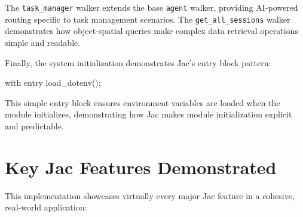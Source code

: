 The \texttt{task\_manager} walker extends the base \texttt{agent} walker, providing AI-powered routing specific to task management scenarios. The \texttt{get\_all\_sessions} walker demonstrates how object-spatial queries make complex data retrieval operations simple and readable.

Finally, the system initialization demonstrates Jac's entry block pattern:

\begin{jacblock}
with entry {
    load_dotenv();
}
\end{jacblock}

This simple entry block ensures environment variables are loaded when the module initializes, demonstrating how Jac makes module initialization explicit and predictable.

\section{Key Jac Features Demonstrated}

This implementation showcases virtually every major Jac feature in a cohesive, real-world application:


